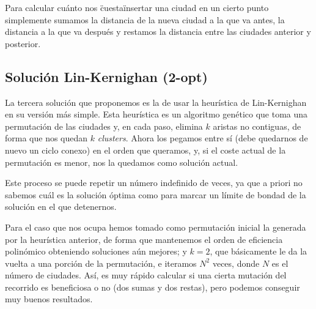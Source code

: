\documentclass[a4paper, 11pt]{article}
\begin{document}
Para calcular cuánto nos \"cuesta\" insertar una ciudad en un cierto punto simplemente sumamos la distancia de la nueva ciudad a la que va antes, la distancia a la que va después y restamos la distancia entre las ciudades anterior y posterior.

\subsection{Solución Lin-Kernighan (2-opt)}
La tercera solución que proponemos es la de usar la heurística de Lin-Kernighan en su versión más simple. Esta heurística es un algoritmo genético que toma una permutación de las ciudades y, en cada paso, elimina $k$ aristas no contiguas, de forma que nos quedan $k$ \textit{clusters}. Ahora los pegamos entre sí (debe quedarnos de nuevo un ciclo conexo) en el orden que queramos, y, si el coste actual de la permutación es menor, nos la quedamos como solución actual.

Este proceso se puede repetir un número indefinido de veces, ya que a priori no sabemos cuál es la solución óptima como para marcar un límite de bondad de la solución en el que detenernos.

Para el caso que nos ocupa hemos tomado como permutación inicial la generada por la heurística anterior, de forma que mantenemos el orden de eficiencia polinómico obteniendo soluciones aún mejores; y $k=2$, que básicamente le da la vuelta a una porción de la permutación, e iteramos $N^2$ veces, donde $N$ es el número de ciudades. Así, es muy rápido calcular si una cierta mutación del recorrido es beneficiosa o no (dos sumas y dos restas), pero podemos conseguir muy buenos resultados.
\end{document}
